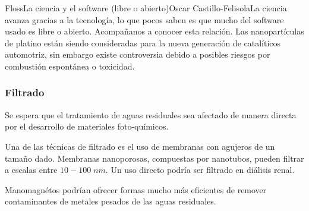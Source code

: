 \begin{article}[2]{Floss}{La ciencia y el software (libre o abierto)}{Oscar Castillo-Felisola}{La ciencia avanza gracias a la tecnolog\'ia, lo que pocos saben es que mucho del software usado es libre o abierto. Acompa\~nanos a conocer esta relaci\'on.}
Las nanopart\'iculas de platino est\'an siendo consideradas para la nueva generaci\'on de catal\'iticos automotriz, sin embargo existe controversia debido a posibles riesgos por combusti\'on espont\'anea o toxicidad.

\subsubsection*{Filtrado}

Se espera que el tratamiento de aguas residuales sea afectado de manera directa por el desarrollo de materiales foto-qu\'imicos.

Una de las t\'ecnicas de filtrado es el uso de membranas con agujeros de un tama\~no dado.  Membranas nanoporosas, compuestas por nanotubos, pueden filtrar a escalas entre $10-100\;nm$. Un uso directo podr\'ia ser filtrado en di\'alisis renal.

Manomagn\'etos podr\'ian ofrecer formas mucho m\'as eficientes de remover contaminantes de metales pesados de las aguas residuales.




\begin{Quellen}
\end{Quellen}

\nocite{Castillo-Felisola:2015nma,Castillo-Felisola:2015ema,Castillo-Felisola:2014xba,Castillo-Felisola:2014iia}
\putbib[References]

\end{article}
